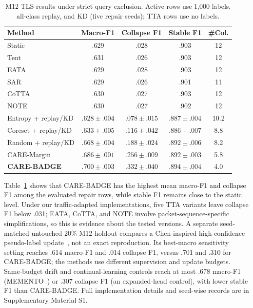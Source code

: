 \documentclass[journal]{IEEEtran}
\newcommand{\ours}{CARE}
\begin{document}
\begin{table}[!t]
\centering
\caption{M12 TLS results under strict query exclusion. Active rows use 1,000 labels, all-class replay, and KD (five repair seeds); TTA rows use no labels.}
\label{tab:main}
\scriptsize
\setlength{\tabcolsep}{3pt}
\begin{tabular}{@{}lcccc@{}}
\toprule
Method & Macro-F1 & Collapse F1 & Stable F1 & \#Col.\\
\midrule
Static & .629 & .028 & .903 & 12\\
Tent & .631 & .026 & .903 & 12\\
EATA & .629 & .028 & .903 & 12\\
SAR & .629 & .026 & .901 & 11\\
CoTTA & .630 & .027 & .903 & 12\\
NOTE & .630 & .027 & .902 & 12\\
\midrule
Entropy + replay/KD & $.628\!\pm\!.004$ & $.078\!\pm\!.015$ & $.887\!\pm\!.004$ & 10.2\\
Coreset + replay/KD & $.633\!\pm\!.005$ & $.116\!\pm\!.042$ & $.886\!\pm\!.007$ & 8.8\\
Random + replay/KD & $.668\!\pm\!.004$ & $.188\!\pm\!.024$ & $.892\!\pm\!.006$ & 8.2\\
\ours{}-Margin & $.686\!\pm\!.001$ & $.256\!\pm\!.009$ & $.892\!\pm\!.003$ & 5.8\\
\textbf{\ours{}-BADGE} & $\mathbf{.700\!\pm\!.003}$ & $\mathbf{.332\!\pm\!.040}$ & $\mathbf{.894\!\pm\!.004}$ & 4.0\\
\bottomrule
\end{tabular}
\end{table}

Table~\ref{tab:main} shows that \ours{}-BADGE has the highest mean macro-F1 and collapse F1 among the evaluated repair rows, while stable F1 remains close to the static level. Under our traffic-adapted implementations, five TTA variants leave collapse F1 below .031; EATA, CoTTA, and NOTE involve packet-sequence-specific simplifications, so this is evidence about the tested versions. A separate seed-matched untouched 20\% M12 holdout compares a Chen-inspired high-confidence pseudo-label update~\cite{chen2025selfevolving}, not an exact reproduction. Its best-macro sensitivity setting reaches .614 macro-F1 and .014 collapse F1, versus .701 and .310 for \ours{}-BADGE; the methods use different supervision and update budgets. Same-budget drift and continual-learning controls reach at most .678 macro-F1 (MEMENTO~\cite{cerasuolo2024memento}) or .307 collapse F1 (an expanded-head control), with lower stable F1 than \ours{}-BADGE. Full implementation details and seed-wise records are in Supplementary Material S1.
\end{document}
